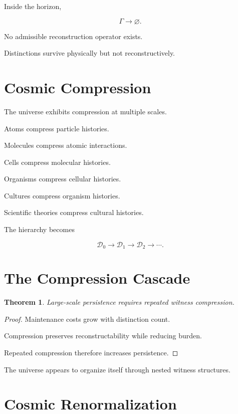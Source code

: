 \documentclass[12pt,oneside]{book}
\theoremstyle{plain} \newtheorem{theorem}{Theorem}[chapter] \newtheorem{lemma}[theorem]{Lemma} \newtheorem{proposition}[theorem]{Proposition} \newtheorem{corollary}[theorem]{Corollary}
\theoremstyle{definition} \newtheorem{definition}[theorem]{Definition} \newtheorem{axiom}[theorem]{Axiom} \newtheorem{construction}[theorem]{Construction}
\theoremstyle{remark} \newtheorem{remark}[theorem]{Remark} \newtheorem{example}[theorem]{Example}
\newcommand{\D}{\mathcal{D}} \newcommand{\R}{\mathcal{R}} \newcommand{\F}{\mathcal{F}} \newcommand{\U}{\mathcal{U}} \newcommand{\M}{\mathcal{M}} \newcommand{\G}{\Gamma}
\begin{document}
Inside the horizon,

\[
\Gamma
\rightarrow
\varnothing.
\]

No admissible reconstruction operator exists.

Distinctions survive physically but not reconstructively.

\section{Cosmic Compression}

The universe exhibits compression at multiple scales.

Atoms compress particle histories.

Molecules compress atomic interactions.

Cells compress molecular histories.

Organisms compress cellular histories.

Cultures compress organism histories.

Scientific theories compress cultural histories.

The hierarchy becomes

\[
\D_0
\rightarrow
\D_1
\rightarrow
\D_2
\rightarrow
\cdots.
\]

\section{The Compression Cascade}

\begin{theorem}

Large-scale persistence requires repeated witness compression.

\end{theorem}

\begin{proof}

Maintenance costs grow with distinction count.

Compression preserves reconstructability while reducing burden.

Repeated compression therefore increases persistence.

\end{proof}

The universe appears to organize itself through nested witness structures.

\section{Cosmic Renormalization}
\end{document}
